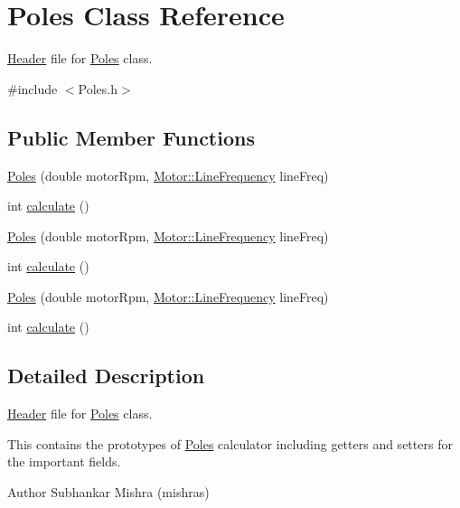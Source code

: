\hypertarget{class_poles}{}\section{Poles Class Reference}
\label{class_poles}


\hyperlink{class_header}{Header} file for \hyperlink{class_poles}{Poles} class.  




{\ttfamily \#include $<$Poles.\+h$>$}

\subsection*{Public Member Functions}
\begin{DoxyCompactItemize}
\item 
\hyperlink{class_poles_aade5d01dab7a461e582449e5bb17f6d6}{Poles} (double motor\+Rpm, \hyperlink{class_motor_acee1bdf1b684ad36cb80dc2829d9fcee}{Motor\+::\+Line\+Frequency} line\+Freq)
\item 
int \hyperlink{class_poles_a23988f68100374c8277dca81ab06f724}{calculate} ()
\item 
\hyperlink{class_poles_aade5d01dab7a461e582449e5bb17f6d6}{Poles} (double motor\+Rpm, \hyperlink{class_motor_acee1bdf1b684ad36cb80dc2829d9fcee}{Motor\+::\+Line\+Frequency} line\+Freq)
\item 
int \hyperlink{class_poles_a23988f68100374c8277dca81ab06f724}{calculate} ()
\item 
\hyperlink{class_poles_aade5d01dab7a461e582449e5bb17f6d6}{Poles} (double motor\+Rpm, \hyperlink{class_motor_acee1bdf1b684ad36cb80dc2829d9fcee}{Motor\+::\+Line\+Frequency} line\+Freq)
\item 
int \hyperlink{class_poles_a23988f68100374c8277dca81ab06f724}{calculate} ()
\end{DoxyCompactItemize}


\subsection{Detailed Description}
\hyperlink{class_header}{Header} file for \hyperlink{class_poles}{Poles} class. 

This contains the prototypes of \hyperlink{class_poles}{Poles} calculator including getters and setters for the important fields.

\begin{DoxyAuthor}{Author}
Subhankar Mishra (mishras) 
\end{DoxyAuthor}


